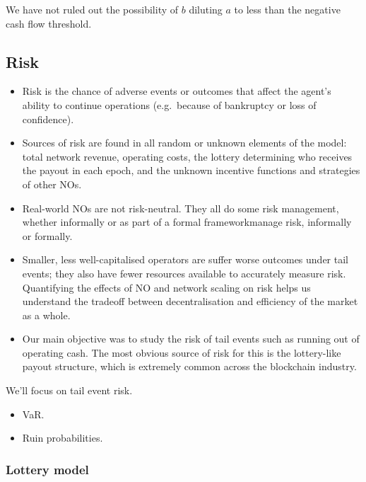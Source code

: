 We have not ruled out the possibility of $b$ diluting $a$ to less than the negative cash flow threshold.



\newpage
\subsection{Risk}

\begin{itemize}
  \item
    Risk is the chance of adverse events or outcomes that affect the agent's ability to continue operations (e.g.~because of bankruptcy or loss of confidence).
  \item
    Sources of risk are found in all random or unknown elements of the model: total network revenue, operating costs, the lottery determining who receives the payout in each epoch, and the unknown incentive functions and strategies of other NOs.
  \item
    Real-world NOs are not risk-neutral. They all do some risk management, whether informally or as part of a formal frameworkmanage risk, informally or formally.
  \item
    Smaller, less well-capitalised operators are suffer worse outcomes under tail events; they also have fewer resources available to accurately measure risk.
    Quantifying the effects of NO and network scaling on risk helps us understand the tradeoff between decentralisation and efficiency of the market as a whole.
  \item
    Our main objective was to study the risk of tail events such as running out of operating cash.
    The most obvious source of risk for this is the lottery-like payout structure, which is extremely common across the blockchain industry.
\end{itemize}


We'll focus on tail event risk.
\begin{itemize}

  \item VaR.
  \item Ruin probabilities.

\end{itemize}

\subsubsection{Lottery model}

